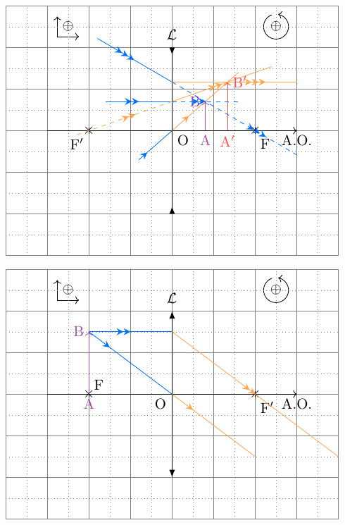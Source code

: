 \documentclass[../../main/main.tex]{subfiles}
\begin{document}
\begin{tcn}[label=impo:cons_exem]
\begin{minipage}{0.50\linewidth}
\begin{center}
			\label{fig:corrconvconstruafter}
		\end{center}
	\end{minipage}
	\begin{minipage}{0.50\linewidth}
		\begin{center}
			\includegraphics[width=\linewidth]{lent_div-constru_after_a}
			\label{fig:corrdivconstruafter}
		\end{center}
	\end{minipage}
	\hfill
	\begin{minipage}{0.50\linewidth}
		\begin{center}
			\includegraphics[width=\linewidth]{lent_conv-constru_F}
			\label{fig:corrconvconstruF}
		\end{center}
	\end{minipage}
\end{tcn}
\end{document}
